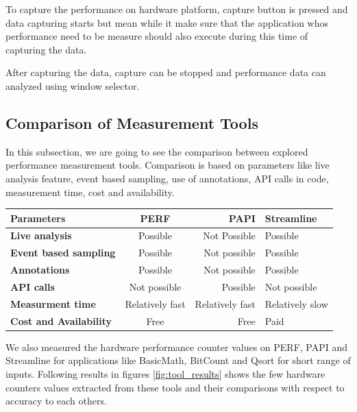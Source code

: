 To capture the performance on hardware platform, capture button is pressed and data capturing starts but mean while it make sure that the application whos performance need to be measure  should also execute during this time of capturing the data. 

After capturing the data, capture can be stopped and performance data can analyzed using window selector. 

\subsection{Comparison of Measurement Tools}

In this subsection, we are going to see the comparison between explored performance measurement tools. Comparison is based on parameters like live analysis feature, event based sampling, use of annotations, API calls in code, measurement time, cost and availability. 


\begin{tabular}{|l|c|r|p{1.7cm}|}
  \hline
  \textbf{Parameters} & \textbf{PERF} & \textbf{PAPI} & \textbf{Streamline}\\
  \hline
  \textbf{Live analysis} & Possible & Not Possible & Possible\\
  \hline
  \textbf{Event based sampling} & Possible & Not possible & Possible\\
  \hline
  \textbf{Annotations} & Possible & Not possible & Possible\\
  \hline
  \textbf{API calls} & Not possible & Possible & Not possible\\
  \hline
  \textbf{Measurment time} & Relatively fast & Relatively fast & Relatively slow\\
  \hline
  \textbf{Cost and Availability} & Free & Free & Paid\\
  \hline
\end{tabular}

\par We also measured the hardware performance counter values on PERF, PAPI and Streamline for applications like BasicMath, BitCount and Qsort for short range of inputs. Following results in figures \ref{fig:tool_results} shows the few hardware counters values extracted from these tools and their comparisons with respect to accuracy to each others. 


